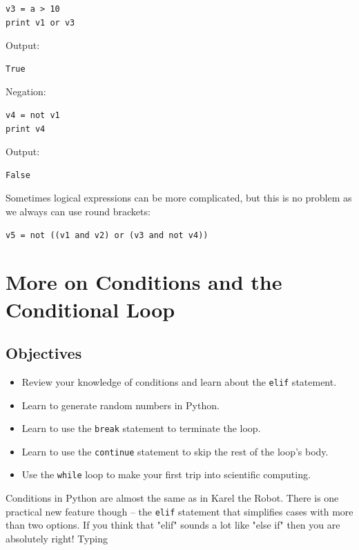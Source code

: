 \begin{verbatim}
v3 = a > 10
print v1 or v3
\end{verbatim}
Output:

\begin{verbatim}
True
\end{verbatim}
Negation:

\begin{verbatim}
v4 = not v1
print v4
\end{verbatim}
Output:

\begin{verbatim}
False
\end{verbatim}
Sometimes logical expressions can be more complicated, but this is no problem
as we always can use round brackets: 

\begin{verbatim}
v5 = not ((v1 and v2) or (v3 and not v4))
\end{verbatim}


\section{More on Conditions and the Conditional Loop} \label{sec:while}

\subsection{Objectives}

\begin{itemize}
\item Review your knowledge of conditions and learn about the {\tt elif} statement.
\item Learn to generate random numbers in Python.
\item Learn to use the {\tt break} statement to terminate the loop.
\item Learn to use the {\tt continue} statement to skip the rest of the loop's body.
\item Use the {\tt while} loop to make your first trip into scientific computing.
\end{itemize}
Conditions in Python are almost the same as in Karel the Robot. There is one practical 
new feature though -- the {\tt elif} statement that simplifies 
cases with more than two options. If you think that "elif" sounds a lot like "else if" then 
you are absolutely right! Typing 


